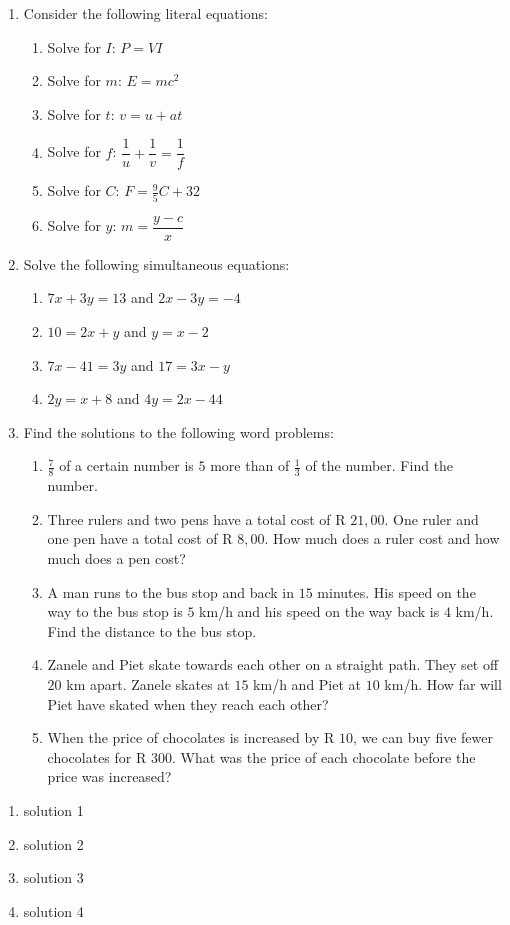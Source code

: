 \begin{eocexercises}{}
\begin{enumerate}[itemsep=5pt, label=\textbf{\arabic*}. ]
\begin{enumerate}[itemsep=6pt,label=\textbf{(\alph*)}]
\end{enumerate}
\item Consider the following literal equations:
\begin{enumerate}[itemsep=6pt,label=\textbf{(\alph*)}]
\item Solve for $I$: $P = VI$
\item Solve for $m$: $E=mc^{2}$
\item Solve for $t$: $v = u + at$
\item Solve for $f$: $\dfrac{1}{u} + \dfrac{1}{v} = \dfrac{1}{f}$
\item Solve for $C$: $F=\frac{9}{5}C + 32$
\item Solve for $y$: $m = \dfrac{y-c}{x}$
\end{enumerate}
\item Solve the following simultaneous equations:
\begin{enumerate}[itemsep=5pt,label=\textbf{(\alph*)}]
\item $7x+3y=13$ and $2x-3y=-4$  
\item $10=2x+y$ and $y=x-2$
\item $7x-41=3y$ and $17=3x-y$
\item $2y=x+8$ and $4y=2x-44$
\end{enumerate}
\item Find the solutions to the following word problems:
\begin{enumerate}[itemsep=5pt,label=\textbf{(\alph*)}]
\item $\frac{7}{8}$ of a certain number is $5$ more than of $\frac{1}{3}$ of the number. Find the number.
\item Three rulers and two pens have a total cost of R $21,00$. One ruler and one pen have a total cost of R $8,00$. How much does a ruler cost and how much does a pen cost? 
\item A man runs to the bus stop and back in $15$ minutes. His speed on the way to the bus stop is $5$ km/h and his speed on the way back is $4$ km/h. Find the distance to the bus stop.
\item Zanele and Piet skate towards each other on a straight path. They set off $20$ km apart. Zanele skates at $15$ km/h and Piet at $10$ km/h. How far will Piet have skated when they reach each other?
\item When the price of chocolates is increased by R $10$, we can buy five fewer chocolates for R $300$. What was the price of each chocolate before the price was increased?
\end{enumerate}
\end{enumerate}

\end{eocexercises}


 \begin{solutions}{}{
\begin{enumerate}[itemsep=5pt, label=\textbf{\arabic*}. ] 


\item solution 1
\item solution 2
\item solution 3
\item solution 4

\end{enumerate}}
\end{solutions}


